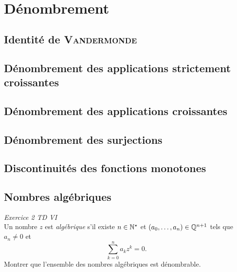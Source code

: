 \chapter{Dénombrement}

\section{Identité de \textsc{Vandermonde}}


\section{Dénombrement des applications strictement croissantes}


\section{Dénombrement des applications croissantes}


\section{Dénombrement des surjections} \label{denombrement_surjections}


\section{Discontinuités des fonctions monotones}


\section{Nombres algébriques}
\begin{exercice}
\emph{Exercice 2 TD VI} \\
Un nombre $z$ est \emph{algébrique} s'il existe $n \in \mathbb{N}^\star$ et $(a_0, \dots, a_n) \in \mathbb{Q}^{n+1}$ tels que $a_n \not=0$ et 
$$\sum_{k=0}^n a_k z^k = 0.$$
Montrer que l'ensemble des nombres algébriques est dénombrable. 
\end{exercice}


